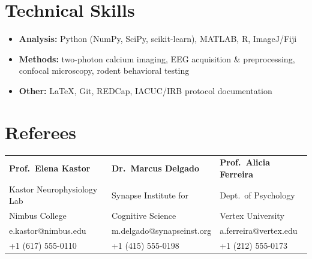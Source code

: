 \documentclass[10pt,a4paper]{article}
\begin{document}
\section*{Technical Skills}
\begin{itemize}
  \item \textbf{Analysis:} Python (NumPy, SciPy, scikit-learn), MATLAB, R, ImageJ/Fiji
  \item \textbf{Methods:} two-photon calcium imaging, EEG acquisition \& preprocessing, confocal microscopy, rodent behavioral testing
  \item \textbf{Other:} LaTeX, Git, REDCap, IACUC/IRB protocol documentation
\end{itemize}

\section*{Referees}
\begin{tabularx}{\textwidth}{@{}X X X@{}}
\textbf{Prof.\ Elena Kastor} & \textbf{Dr.\ Marcus Delgado} & \textbf{Prof.\ Alicia Ferreira} \\
{\small\color{softgray}Kastor Neurophysiology Lab} & {\small\color{softgray}Synapse Institute for} & {\small\color{softgray}Dept.\ of Psychology} \\
{\small\color{softgray}Nimbus College} & {\small\color{softgray}Cognitive Science} & {\small\color{softgray}Vertex University} \\
{\small e.kastor@nimbus.edu} & {\small m.delgado@synapseinst.org} & {\small a.ferreira@vertex.edu} \\
{\small +1 (617) 555-0110} & {\small +1 (415) 555-0198} & {\small +1 (212) 555-0173} \\
\end{tabularx}
\end{document}
